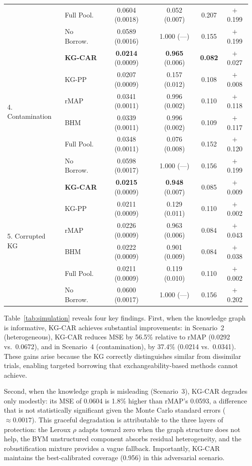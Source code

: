 \documentclass[12pt]{article}
\begin{document}
\begin{table}[ht]
\begin{tabular}{llcccc}
& Full Pool. & 0.0604 (0.0018) & 0.052 (0.007) & 0.207 & $+$0.199 \\
& No Borrow. & 0.0589 (0.0016) & 1.000 (---) & 0.155 & $+$0.199 \\
\midrule
\multirow{6}{*}{4. Contamination}
& \textbf{KG-CAR} & \textbf{0.0214} (0.0009) & \textbf{0.965} (0.006) & \textbf{0.082} & $+$0.027 \\
& KG-PP & 0.0207 (0.0009) & 0.157 (0.012) & 0.108 & $+$0.008 \\
& rMAP & 0.0341 (0.0011) & 0.996 (0.002) & 0.110 & $+$0.118 \\
& BHM & 0.0339 (0.0011) & 0.996 (0.002) & 0.109 & $+$0.117 \\
& Full Pool. & 0.0348 (0.0011) & 0.076 (0.008) & 0.152 & $+$0.120 \\
& No Borrow. & 0.0598 (0.0017) & 1.000 (---) & 0.156 & $+$0.199 \\
\midrule
\multirow{6}{*}{5. Corrupted KG}
& \textbf{KG-CAR} & \textbf{0.0215} (0.0009) & \textbf{0.948} (0.007) & 0.085 & $+$0.009 \\
& KG-PP & 0.0211 (0.0009) & 0.129 (0.011) & 0.110 & $+$0.002 \\
& rMAP & 0.0226 (0.0009) & 0.963 (0.006) & 0.084 & $+$0.043 \\
& BHM & 0.0222 (0.0009) & 0.901 (0.009) & 0.084 & $+$0.038 \\
& Full Pool. & 0.0211 (0.0009) & 0.119 (0.010) & 0.110 & $+$0.002 \\
& No Borrow. & 0.0600 (0.0017) & 1.000 (---) & 0.156 & $+$0.202 \\
\bottomrule
\end{tabular}
\end{table}

Table~\ref{tab:simulation} reveals four key findings. First, when the knowledge graph is informative, KG-CAR achieves substantial improvements: in Scenario~2 (heterogeneous), KG-CAR reduces MSE by 56.5\% relative to rMAP (0.0292 vs.\ 0.0672), and in Scenario~4 (contamination), by 37.4\% (0.0214 vs.\ 0.0341). These gains arise because the KG correctly distinguishes similar from dissimilar trials, enabling targeted borrowing that exchangeability-based methods cannot achieve.

Second, when the knowledge graph is misleading (Scenario~3), KG-CAR degrades only modestly: its MSE of 0.0604 is 1.8\% higher than rMAP's 0.0593, a difference that is not statistically significant given the Monte Carlo standard errors ($\approx 0.0017$). This graceful degradation is attributable to the three layers of protection: the Leroux $\rho$ adapts toward zero when the graph structure does not help, the BYM unstructured component absorbs residual heterogeneity, and the robustification mixture provides a vague fallback. Importantly, KG-CAR maintains the best-calibrated coverage (0.956) in this adversarial scenario.
\end{document}
